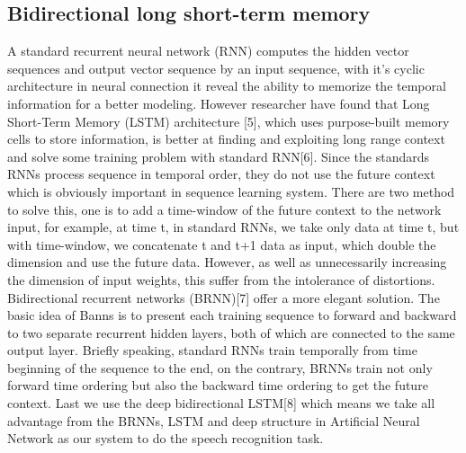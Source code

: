 \documentclass[conference]{IEEEtran}
\begin{document}
\subsection{Bidirectional long short-term memory}
A standard recurrent neural network (RNN) computes the hidden vector sequences and output vector sequence by an input sequence, with it's cyclic architecture in neural connection it reveal the ability to memorize the temporal information for a better modeling.  However researcher have found that Long Short-Term Memory (LSTM) architecture [5], which uses purpose-built memory cells to store information, is better at finding and exploiting long range context and solve some training problem with standard RNN[6].  Since the standards RNNs process sequence in temporal order, they do not use the future context which is obviously important in sequence learning system.  There are two method to solve this, one is to add a time-window of the future context to the network input, for example, at time t, in standard RNNs, we take only data at time t, but with time-window, we concatenate t and t+1 data as input, which double the dimension and use the future data.  However, as well as unnecessarily increasing the dimension of input weights, this suffer from the intolerance of distortions.  Bidirectional recurrent networks (BRNN)[7] offer a more elegant solution.  The basic idea of Banns is to present each training sequence to forward and backward to two separate recurrent hidden layers, both of which are connected to the same output layer.  Briefly speaking, standard RNNs train temporally from time beginning of the sequence to the end, on the contrary,  BRNNs train not only forward time ordering but also the backward time ordering to get the future context.  Last we use the deep bidirectional LSTM[8] which means we take all advantage from the BRNNs, LSTM and deep structure in Artificial Neural Network as our system to do the speech recognition task.  
\end{document}
